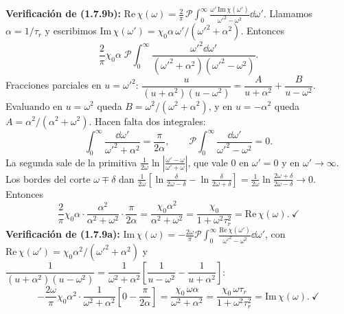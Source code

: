 \textbf{Verificación de (1.7.9b):} $\mathrm{Re}\,\chi(\omega)=\frac{2}{\pi}\,\mathcal P\!\int_0^\infty\frac{\omega'\,\mathrm{Im}\,\chi(\omega')}{\omega'^2-\omega^2}\dd\omega'$.
Llamamos $\alpha=1/\tau_r$ y escribimos $\mathrm{Im}\,\chi(\omega')=\chi_0\alpha\,\omega'/(\omega'^2+\alpha^2)$. Entonces
\[
\frac{2}{\pi}\chi_0\alpha\;\mathcal P\!\int_0^\infty\frac{\omega'^2\dd\omega'}{(\omega'^2+\alpha^2)(\omega'^2-\omega^2)}.
\]
Fracciones parciales en $u=\omega'^2$: $\dfrac{u}{(u+\alpha^2)(u-\omega^2)}=\dfrac{A}{u+\alpha^2}+\dfrac{B}{u-\omega^2}$. Evaluando en $u=\omega^2$ queda
$B=\omega^2/(\omega^2+\alpha^2)$, y en $u=-\alpha^2$ queda $A=\alpha^2/(\alpha^2+\omega^2)$. Hacen falta dos integrales:
\[
\int_0^\infty\frac{\dd\omega'}{\omega'^2+\alpha^2}=\frac{\pi}{2\alpha},\qquad
\mathcal P\!\int_0^\infty\frac{\dd\omega'}{\omega'^2-\omega^2}=0.
\]
La segunda sale de la primitiva $\frac{1}{2\omega}\ln\left|\frac{\omega'-\omega}{\omega'+\omega}\right|$, que vale 0 en $\omega'=0$ y en $\omega'\to\infty$. Los bordes
del corte $\omega\mp\delta$ dan $\frac{1}{2\omega}\left[\ln\frac{\delta}{2\omega-\delta}-\ln\frac{\delta}{2\omega+\delta}\right]=\frac{1}{2\omega}\ln\frac{2\omega+\delta}{2\omega-\delta}\to0$. Entonces
\[
\frac{2}{\pi}\chi_0\alpha\cdot\frac{\alpha^2}{\alpha^2+\omega^2}\cdot\frac{\pi}{2\alpha}=\frac{\chi_0\alpha^2}{\alpha^2+\omega^2}=\frac{\chi_0}{1+\omega^2\tau_r^2}=\mathrm{Re}\,\chi(\omega).\ \checkmark
\]
\textbf{Verificación de (1.7.9a):} $\mathrm{Im}\,\chi(\omega)=-\frac{2\omega}{\pi}\mathcal P\!\int_0^\infty\frac{\mathrm{Re}\,\chi(\omega')}{\omega'^2-\omega^2}\dd\omega'$, con
$\mathrm{Re}\,\chi(\omega')=\chi_0\alpha^2/(\omega'^2+\alpha^2)$ y
$\dfrac{1}{(u+\alpha^2)(u-\omega^2)}=\dfrac{1}{\omega^2+\alpha^2}\left[\dfrac{1}{u-\omega^2}-\dfrac{1}{u+\alpha^2}\right]$:
\[
-\frac{2\omega}{\pi}\chi_0\alpha^2\cdot\frac{1}{\omega^2+\alpha^2}\left[0-\frac{\pi}{2\alpha}\right]=\frac{\chi_0\,\omega\alpha}{\omega^2+\alpha^2}=\frac{\chi_0\,\omega\tau_r}{1+\omega^2\tau_r^2}=\mathrm{Im}\,\chi(\omega).\ \checkmark
\]

